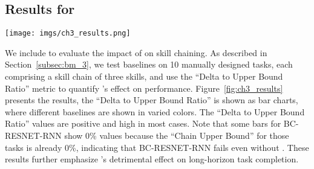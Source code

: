 \subsection{Results for \bmc}
\label{subsec:results_bmc}

% 

\begin{figure*}[ht]
    \centering
    \texttt{[image: imgs/ch3\_results.png]} 
    \caption{This figure presents the results for \bmc, where the ``Delta to Upper Bound Ratio'' (bars) is positive and notably high in most cases, highlighting the substantial negative impact of \pb on long-horizon task completion. 
    }
    \vspace{-1.75em}
    \label{fig:ch3_results}
\end{figure*}

We include \bmc to evaluate the impact of \pb on skill chaining. As described in Section~\ref{subsec:bm_3}, we test baselines on 10 manually designed tasks, each comprising a skill chain of three skills, and use the ``Delta to Upper Bound Ratio'' metric to quantify \pb's effect on performance. Figure~\ref{fig:ch3_results} presents the results, the ``Delta to Upper Bound Ratio'' is shown as bar charts, where different baselines are shown in varied colors. The ``Delta to Upper Bound Ratio'' values are positive and high in most cases. Note that some bars for BC-RESNET-RNN show 0\% values because the ``Chain Upper Bound'' for those tasks is already 0\%, indicating that BC-RESNET-RNN fails even without \pb. These results further emphasize \pb's detrimental effect on long-horizon task completion.
